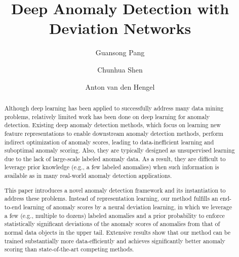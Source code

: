 \documentclass[sigconf]{acmart}
\begin{document}
\title[Deep Anomaly Detection with Deviation Networks]{Deep Anomaly Detection with Deviation Networks}


\author{Guansong Pang}

\author{Chunhua Shen}

\author{Anton van den Hengel}




\begin{abstract}

Although deep learning has been applied to successfully address many data mining problems, relatively limited work has been done on deep learning for anomaly detection. Existing deep anomaly detection methods, which focus on learning new feature representations to enable downstream anomaly detection methods, perform indirect optimization of anomaly scores, leading to data-inefficient learning and suboptimal anomaly scoring. Also, they are typically designed as unsupervised learning due to the lack of large-scale labeled anomaly data. As a result, they are difficult to leverage prior knowledge (e.g., a few labeled anomalies) when such information is available as in many real-world anomaly detection applications. 

This paper introduces a novel anomaly detection framework and its instantiation to address these problems. Instead of representation learning, our method fulfills an end-to-end learning of anomaly scores by a neural deviation learning, in which we leverage a few  (e.g., multiple to dozens) labeled anomalies and a prior probability to enforce statistically significant deviations of the anomaly scores of anomalies from that of normal data objects in the upper tail. Extensive results show that our method can be trained substantially more data-efficiently and achieves significantly better anomaly scoring than state-of-the-art competing methods.



\end{abstract}
\end{document}

